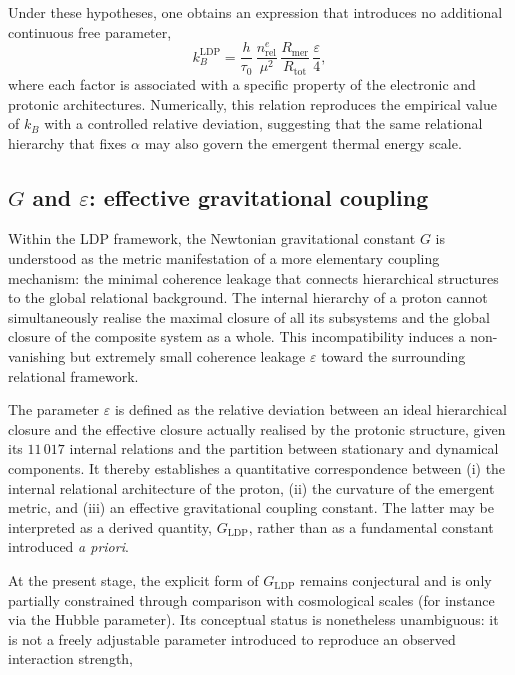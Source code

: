 \documentclass[11pt,a4paper]{article}
\begin{document}
Under these hypotheses, one obtains an expression that introduces no additional continuous free parameter,
\[
k_{B}^{\mathrm{LDP}} = \frac{h}{\tau_{0}} \, \frac{n_{\mathrm{rel}}^{e}}{\mu^{2}} \, \frac{R_{\mathrm{mer}}}{R_{\mathrm{tot}}} \, \frac{\varepsilon}{4},
\]
where each factor is associated with a specific property of the electronic and protonic architectures. Numerically, this relation reproduces the empirical value of \(k_{B}\) with a controlled relative deviation, suggesting that the same relational hierarchy that fixes \(\alpha\) may also govern the emergent thermal energy scale.

\subsection{\texorpdfstring{\(G\)}{G} and \texorpdfstring{\(\varepsilon\)}{ε}: effective gravitational coupling}

Within the LDP framework, the Newtonian gravitational constant \(G\) is understood as the metric manifestation of a more elementary coupling mechanism: the minimal coherence leakage that connects hierarchical structures to the global relational background. The internal hierarchy of a proton cannot simultaneously realise the maximal closure of all its subsystems and the global closure of the composite system as a whole. This incompatibility induces a non-vanishing but extremely small coherence leakage \(\varepsilon\) toward the surrounding relational framework.

The parameter \(\varepsilon\) is defined as the relative deviation between an ideal hierarchical closure and the effective closure actually realised by the protonic structure, given its \(11\,017\) internal relations and the partition between stationary and dynamical components. It thereby establishes a quantitative correspondence between (i) the internal relational architecture of the proton, (ii) the curvature of the emergent metric, and (iii) an effective gravitational coupling constant. The latter may be interpreted as a derived quantity, \(G_{\mathrm{LDP}}\), rather than as a fundamental constant introduced \emph{a priori}.

At the present stage, the explicit form of \(G_{\mathrm{LDP}}\) remains conjectural and is only partially constrained through comparison with cosmological scales (for instance via the Hubble parameter). Its conceptual status is nonetheless unambiguous: it is not a freely adjustable parameter introduced to reproduce an observed interaction strength,
\end{document}
